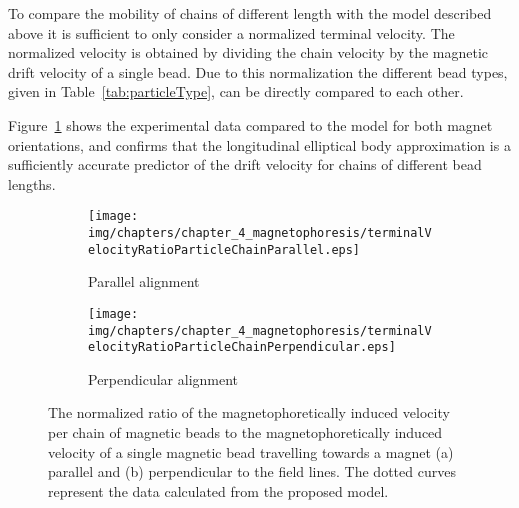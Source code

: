 To compare the mobility of chains of different length with the model described above it is sufficient to only consider a normalized terminal velocity. The normalized velocity is obtained by dividing the chain velocity by the magnetic drift velocity of a single bead. Due to this normalization the different bead types, given in Table~\ref{tab:particleType}, can be directly compared to each other. 

Figure~\ref{fig:magnetophoreticVelocityOfDifferentChainLenghts} shows the experimental data compared to the model for both magnet orientations, and confirms that the longitudinal elliptical body approximation is a sufficiently accurate predictor of the drift velocity for chains of different bead lengths. 

\begin{figure}[htb]
        \centering
        \begin{subfigure}[b]{0.48\textwidth}
                \texttt{[image: img/chapters/chapter\_4\_magnetophoresis/terminalVelocityRatioParticleChainParallel.eps]}
                \caption{Parallel alignment}
        \end{subfigure}
        \hfill
        \begin{subfigure}[b]{0.48\textwidth}
                \texttt{[image: img/chapters/chapter\_4\_magnetophoresis/terminalVelocityRatioParticleChainPerpendicular.eps]}
                \caption{Perpendicular alignment}
        \end{subfigure}
        \caption[Normalized magnetophoretically induced velocity of different particle chain lengths]{The normalized ratio of the magnetophoretically induced velocity per chain of magnetic beads to the magnetophoretically induced velocity of a single magnetic bead travelling towards a magnet (a) parallel and (b) perpendicular to the field lines. The dotted curves represent the data calculated from the proposed model.}
        \label{fig:magnetophoreticVelocityOfDifferentChainLenghts}
\end{figure}

